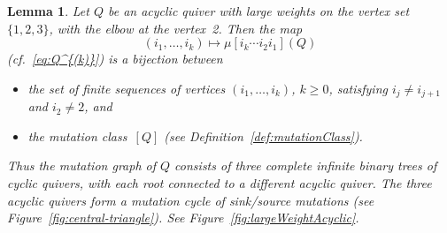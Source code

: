 \documentclass[11pt, letterpaper]{amsart}
\newtheorem{lemma}[theorem]{Lemma}
\theoremstyle{definition}
\numberwithin{equation}{section}
\begin{document}
\begin{lemma}
\label{lem:3VertexAcyclicAscents-1}
Let $Q$ be an acyclic quiver with large weights on the vertex set $\{1,2,3\}$,
with the elbow at the vertex~2.  
Then the map
\begin{equation*}
(i_1,\dots,i_k) \mapsto \mu[i_k \cdots i_2 i_1](Q)
\end{equation*}
(cf.~\eqref{eq:Q^{(k)}}) is a bijection between 
\begin{itemize}[leftmargin=.2in]
\item 
the set of  finite sequences of vertices $(i_1,\dots,i_k)$, $k\ge 0$, satisfying $i_j \neq i_{j+1}$ and $i_2\ne 2$, and  
\item
the mutation class~$[Q]$ (see Definition~\ref{def:mutationClass}). 
\end{itemize}
Thus the mutation graph of $Q$ consists of three complete infinite binary trees of cyclic quivers, with each root connected to a different acyclic quiver.
The three acyclic quivers form a mutation cycle of sink/source mutations (see Figure~\ref{fig:central-triangle}).
See Figure~\ref{fig:largeWeightAcyclic}. 
\end{lemma}
\end{document}
